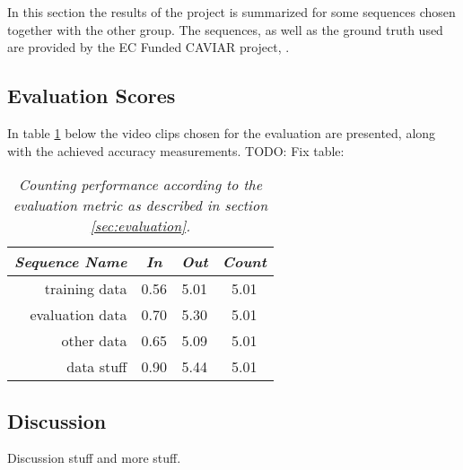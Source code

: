 In this section the results of the project is summarized for some sequences chosen together with the other group. The sequences, as well as the ground truth used are provided by the EC Funded CAVIAR project, \cite{CAVIAR}.

\subsection{Evaluation Scores}
In table \ref{tab:evaluation_performance} below the video clips chosen for the evaluation are presented, along with the achieved accuracy measurements.
TODO: Fix table:
\begin{table}[h]
\centering
	\begin{tabular}{r | c | c | c}
		\emph{Sequence Name}		& \emph{In} & \emph{Out} & \emph{Count}\\
		\hline \hline
		training data			& 0.56 & 5.01 & 5.01 \\
		evaluation data			& 0.70 & 5.30 & 5.01 \\
		other data				& 0.65 & 5.09 & 5.01 \\
		data stuff 				& 0.90 & 5.44 & 5.01 \\
	\end{tabular}
	\caption{\textit{Counting performance according to the evaluation metric as described in section \ref{sec:evaluation}.}}
	\label{tab:evaluation_performance}
\end{table}


\subsection{Discussion}
Discussion stuff and more stuff.


